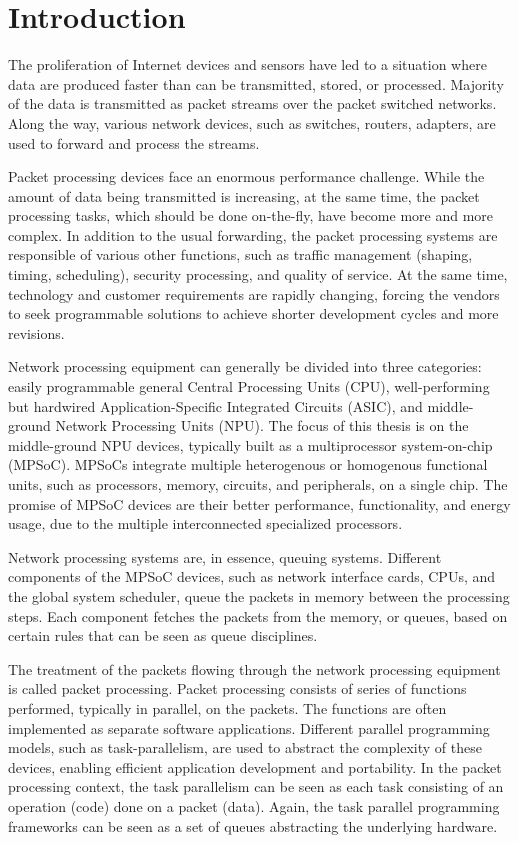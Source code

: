 \chapter{Introduction}
\label{chapter:intro}
The proliferation of Internet devices and sensors have led to a situation where data are produced faster than can be transmitted, stored, or processed. Majority of the data is transmitted as packet streams over the packet switched networks. Along the way, various network devices, such as switches, routers, adapters, are used to forward and process the streams.

Packet processing devices face an enormous performance challenge. While the amount of data being transmitted is increasing, at the same time, the packet processing tasks, which should be done on-the-fly, have become more and more complex. In addition to the usual forwarding, the packet processing systems are responsible of various other functions, such as traffic management (shaping, timing, scheduling), security processing, and quality of service. At the same time, technology and customer requirements are rapidly changing, forcing the vendors to seek programmable solutions to achieve shorter development cycles and more revisions.

Network processing equipment can generally be divided into three categories: easily programmable general Central Processing Units (CPU), well-performing but hardwired Application-Specific Integrated Circuits (ASIC), and middle-ground Network Processing Units (NPU). The focus of this thesis is on the middle-ground NPU devices, typically built as a multiprocessor system-on-chip (MPSoC). MPSoCs integrate multiple heterogenous or homogenous functional units, such as processors, memory, circuits, and peripherals, on a single chip. The promise of MPSoC devices are their better performance,  functionality, and energy usage, due to the multiple interconnected specialized processors.

Network processing systems are, in essence, queuing systems. Different components of the MPSoC devices, such as network interface cards, CPUs, and the global system scheduler, queue the packets in memory between the processing steps. Each component fetches the packets from the memory, or queues, based on certain rules that can be seen as queue disciplines.

The treatment of the packets flowing through the network processing equipment is called packet processing. Packet processing consists of series of functions performed, typically in parallel, on the packets. The functions are often implemented as separate software applications. Different parallel programming models, such as task-parallelism, are used to abstract the complexity of these devices, enabling efficient application development and portability. In the packet processing context, the task parallelism can be seen as each task consisting of an operation (code) done on a packet (data). Again, the task parallel programming frameworks can be seen as a set of queues abstracting the underlying hardware.

